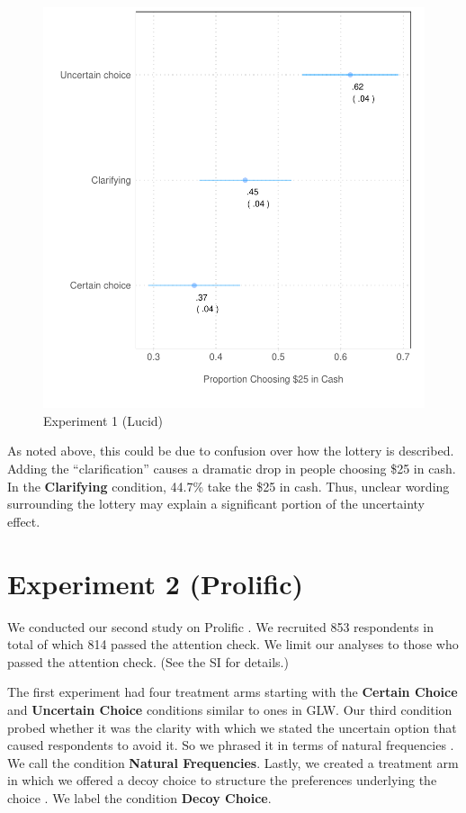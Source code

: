 \documentclass[12pt, letterpaper]{article}
\begin{document}
\begin{figure}[h]
    \centering
    \includegraphics{figs/lucid_exp.pdf}
    \caption{Experiment 1 (Lucid)}
    \label{fig:exp_1_lucid}
\end{figure}

As noted above, this could be due to confusion over how the lottery is described. Adding the ``clarification'' causes a dramatic drop in people choosing \$25 in cash. In the \textbf{Clarifying} condition, 44.7\% take the \$25 in cash. Thus, unclear wording surrounding the lottery may explain a significant portion of the uncertainty effect.

\section*{Experiment 2 (Prolific)}

We conducted our second study on Prolific \citep{palan2018prolific}. We recruited 853 respondents in total of which 814 passed the attention check. We limit our analyses to those who passed the attention check. (See the SI for details.)

The first experiment had four treatment arms starting with the \textbf{Certain Choice} and \textbf{Uncertain Choice} conditions similar to ones in GLW. Our third condition probed whether it was the clarity with which we stated the uncertain option that caused respondents to avoid it. So we phrased it in terms of natural frequencies \citep{gigerenzer2011natural}. We call the condition \textbf{Natural Frequencies}. Lastly, we created a treatment arm in which we offered a decoy choice to structure the preferences underlying the choice \citep{ariely2008predictably}. We label the condition \textbf{Decoy Choice}.
\end{document}
